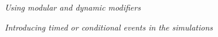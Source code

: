 \documentclass[12pt,letterpaper]{article}
\renewcommand{\subsection}[1]{%
\bigskip
\begin{center}
\begin{large}
\normalfont\itshape #1
\end{large}
\end{center}}
\begin{document}









\subsection{Using modular and dynamic modifiers}


\subsection{Introducing timed or conditional events in the simulations}
\end{document}
